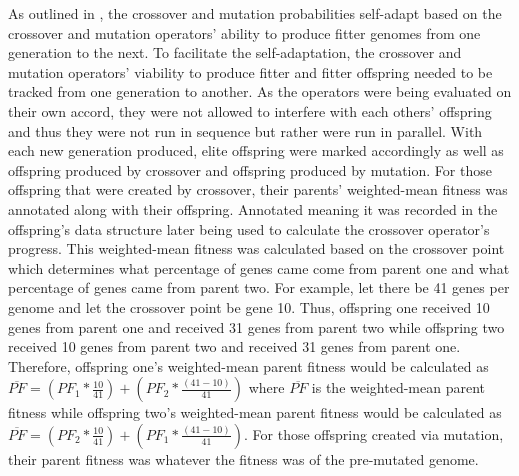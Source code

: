 As outlined in \cite{self_adapt}, the crossover and mutation probabilities self-adapt based on the crossover and mutation operators' ability to produce fitter genomes from one generation to the next. To facilitate the self-adaptation, the crossover and mutation operators' viability to produce fitter and fitter offspring needed to be tracked from one generation to another. As the operators were being evaluated on their own accord, they were not allowed to interfere with each others' offspring and thus they were not run in sequence but rather were run in parallel. With each new generation produced, elite offspring were marked accordingly as well as offspring produced by crossover and offspring produced by mutation. For those offspring that were created by crossover, their parents' weighted-mean fitness was annotated along with their offspring. Annotated meaning it was recorded in the offspring's data structure later being used to calculate the crossover operator's progress. This weighted-mean fitness was calculated based on the crossover point which determines what percentage of genes came come from parent one and what percentage of genes came from parent two. For example, let there be 41 genes per genome and let the crossover point be gene 10. Thus, offspring one received 10 genes from parent one and received 31 genes from parent two while offspring two received 10 genes from parent two and received 31 genes from parent one. Therefore, offspring one's weighted-mean parent fitness would be calculated as $\overline{PF} = \left ( PF_1 * \frac{10}{41} \right ) + \left (PF_2 * \frac{(41-10)}{41} \right)$ where $\overline{PF}$ is the weighted-mean parent fitness while offspring two's weighted-mean parent fitness would be calculated as $\overline{PF} = \left ( PF_2 * \frac{10}{41} \right ) + \left (PF_1 * \frac{(41-10)}{41} \right)$. For those offspring created via mutation, their parent fitness was whatever the fitness was of the pre-mutated genome. 

